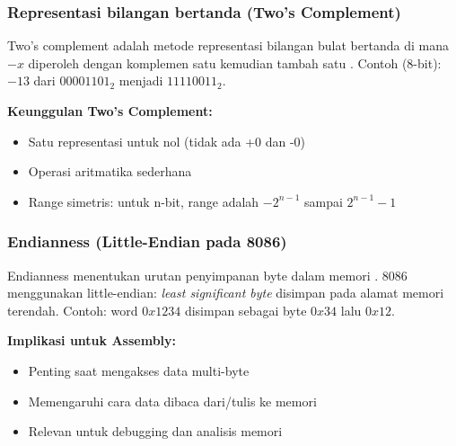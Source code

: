 \subsubsection{Representasi bilangan bertanda (Two's Complement)}
Two's complement adalah metode representasi bilangan bulat bertanda di mana \(-x\) diperoleh dengan komplemen satu kemudian tambah satu \cite{wiki_two_complement}. Contoh (8-bit): \(-13\) dari \(00001101_2\) menjadi \(11110011_2\).

\textbf{Keunggulan Two's Complement:}
\begin{itemize}
    \item Satu representasi untuk nol (tidak ada +0 dan -0)
    \item Operasi aritmatika sederhana
    \item Range simetris: untuk n-bit, range adalah \(-2^{n-1}\) sampai \(2^{n-1}-1\)
\end{itemize}

\subsubsection{Endianness (Little-Endian pada 8086)}
Endianness menentukan urutan penyimpanan byte dalam memori \cite{wiki_endianness}. 8086 menggunakan little-endian: \textit{least significant byte} disimpan pada alamat memori terendah. Contoh: word \(0x1234\) disimpan sebagai byte \(0x34\) lalu \(0x12\).

\textbf{Implikasi untuk Assembly:}
\begin{itemize}
    \item Penting saat mengakses data multi-byte
    \item Memengaruhi cara data dibaca dari/tulis ke memori
    \item Relevan untuk debugging dan analisis memori
\end{itemize}

